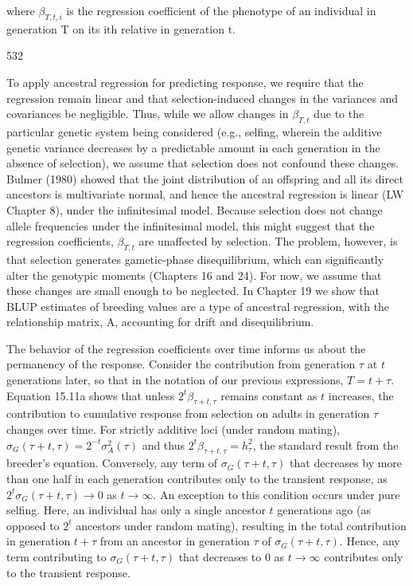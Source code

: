 \documentclass{article}
\begin{document}
where  $ \beta_{T,t,i} $ is the regression coefficient of the phenotype of an individual in generation T on its ith relative in generation t.

532

To apply ancestral regression for predicting response, we require that the regression remain linear and that selection-induced changes in the variances and covariances be negligible. Thus, while we allow changes in  $ \beta_{T,t} $ due to the particular genetic system being considered (e.g., selfing, wherein the additive genetic variance decreases by a predictable amount in each generation in the absence of selection), we assume that selection does not confound these changes. Bulmer (1980) showed that the joint distribution of an offspring and all its direct ancestors is multivariate normal, and hence the ancestral regression is linear (LW Chapter 8), under the infinitesimal model. Because selection does not change allele frequencies under the infinitesimal model, this might suggest that the regression coefficients,  $ \beta_{T,t} $ are unaffected by selection. The problem, however, is that selection generates gametic-phase disequilibrium, which can significantly alter the genotypic moments (Chapters 16 and 24). For now, we assume that these changes are small enough to be neglected. In Chapter 19 we show that BLUP estimates of breeding values are a type of ancestral regression, with the relationship matrix, A, accounting for drift and disequilibrium.

The behavior of the regression coefficients over time informs us about the permanency of the response. Consider the contribution from generation  $ \tau $ at  $ t $ generations later, so that in the notation of our previous expressions,  $ T = t + \tau $. Equation 15.11a shows that unless  $ 2^t \beta_{\tau + t, \tau} $ remains constant as  $ t $ increases, the contribution to cumulative response from selection on adults in generation  $ \tau $ changes over time. For strictly additive loci (under random mating),  $ \sigma_G(\tau + t, \tau) = 2^{-t} \sigma_A^2(\tau) $ and thus  $ 2^t \beta_{\tau + t, \tau} = h_\tau^2 $, the standard result from the breeder's equation. Conversely, any term of  $ \sigma_G(\tau + t, \tau) $ that decreases by more than one half in each generation contributes only to the transient response, as  $ 2^t \sigma_G(\tau + t, \tau) \to 0 $ as  $ t \to \infty $. An exception to this condition occurs under pure selfing. Here, an individual has only a single ancestor  $ t $ generations ago (as opposed to  $ 2^t $ ancestors under random mating), resulting in the total contribution in generation  $ t + \tau $ from an ancestor in generation  $ \tau $ of  $ \sigma_G(\tau + t, \tau) $. Hence, any term contributing to  $ \sigma_G(\tau + t, \tau) $ that decreases to  $ 0 $ as  $ t \to \infty $ contributes only to the transient response.
\end{document}
